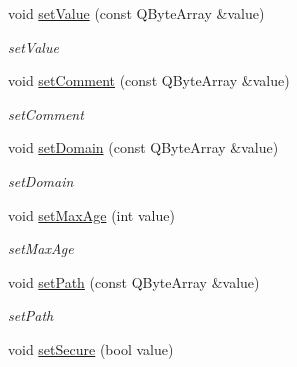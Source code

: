 \begin{DoxyCompactItemize}
\mbox{\label{class_http_cookie_a2f38c00473e7628a708eae2dd0cd51f0}} 
void \hyperlink{class_http_cookie_a2f38c00473e7628a708eae2dd0cd51f0}{set\+Value} (const Q\+Byte\+Array \&value)
\begin{DoxyCompactList}\small\item\em set\+Value \end{DoxyCompactList}\item 
\mbox{\label{class_http_cookie_a6a9709c1d8ca8efff2b838f59d3608da}} 
void \hyperlink{class_http_cookie_a6a9709c1d8ca8efff2b838f59d3608da}{set\+Comment} (const Q\+Byte\+Array \&value)
\begin{DoxyCompactList}\small\item\em set\+Comment \end{DoxyCompactList}\item 
\mbox{\label{class_http_cookie_a4ec7882f6522cf1649ac0c603a509212}} 
void \hyperlink{class_http_cookie_a4ec7882f6522cf1649ac0c603a509212}{set\+Domain} (const Q\+Byte\+Array \&value)
\begin{DoxyCompactList}\small\item\em set\+Domain \end{DoxyCompactList}\item 
\mbox{\label{class_http_cookie_aa676ea32debc7e2cd1c23409558ef511}} 
void \hyperlink{class_http_cookie_aa676ea32debc7e2cd1c23409558ef511}{set\+Max\+Age} (int value)
\begin{DoxyCompactList}\small\item\em set\+Max\+Age \end{DoxyCompactList}\item 
\mbox{\label{class_http_cookie_a11e71d04289abd6e446b71388ab29d1a}} 
void \hyperlink{class_http_cookie_a11e71d04289abd6e446b71388ab29d1a}{set\+Path} (const Q\+Byte\+Array \&value)
\begin{DoxyCompactList}\small\item\em set\+Path \end{DoxyCompactList}\item 
\mbox{\label{class_http_cookie_af09be36c58205effd7f6a7e9bb42bef2}} 
void \hyperlink{class_http_cookie_af09be36c58205effd7f6a7e9bb42bef2}{set\+Secure} (bool value)

\end{DoxyCompactItemize}
